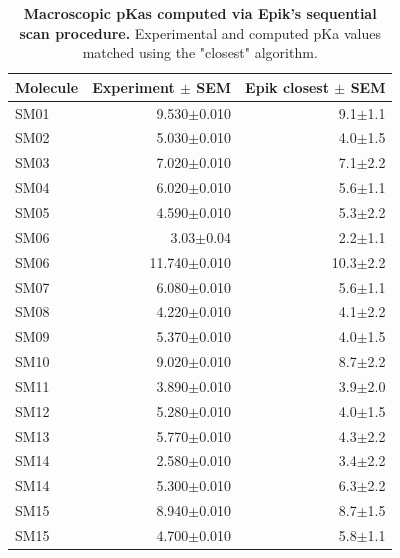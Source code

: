 \documentclass[9pt,lineno]{elife}
\begin{document}
\begin{table}
\centering
\caption{{\bf Macroscopic pKas computed via Epik's sequential scan procedure.}
 Experimental and computed pKa values matched using the "closest" algorithm.
 }
\small
\label{tab:molecule-macro}
\begin{tabular}{lrr}
\toprule
{\bf Molecule} & {\bf Experiment $\pm$ SEM} & {\bf Epik closest $\pm$ SEM} \\
\midrule
    SM01 &      9.530$\pm$0.010 &            9.1$\pm$1.1 \\
    SM02 &      5.030$\pm$0.010 &            4.0$\pm$1.5 \\
    SM03 &      7.020$\pm$0.010 &            7.1$\pm$2.2 \\
    SM04 &      6.020$\pm$0.010 &            5.6$\pm$1.1 \\
    SM05 &      4.590$\pm$0.010 &            5.3$\pm$2.2 \\
    SM06 &        3.03$\pm$0.04 &            2.2$\pm$1.1 \\
    SM06 &     11.740$\pm$0.010 &           10.3$\pm$2.2 \\
    SM07 &      6.080$\pm$0.010 &            5.6$\pm$1.1 \\
    SM08 &      4.220$\pm$0.010 &            4.1$\pm$2.2 \\
    SM09 &      5.370$\pm$0.010 &            4.0$\pm$1.5 \\
    SM10 &      9.020$\pm$0.010 &            8.7$\pm$2.2 \\
    SM11 &      3.890$\pm$0.010 &            3.9$\pm$2.0 \\
    SM12 &      5.280$\pm$0.010 &            4.0$\pm$1.5 \\
    SM13 &      5.770$\pm$0.010 &            4.3$\pm$2.2 \\
    SM14 &      2.580$\pm$0.010 &            3.4$\pm$2.2 \\
    SM14 &      5.300$\pm$0.010 &            6.3$\pm$2.2 \\
    SM15 &      8.940$\pm$0.010 &            8.7$\pm$1.5 \\
    SM15 &      4.700$\pm$0.010 &            5.8$\pm$1.1 \\

\end{tabular}
\end{table}
\end{document}
